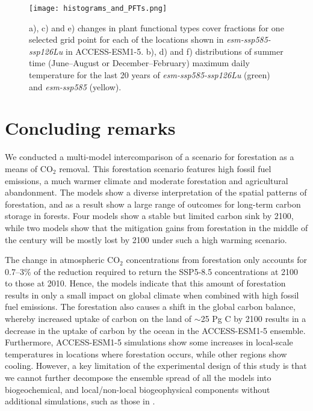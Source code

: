 \documentclass[draft]{agujournal2019}
\begin{document}
\begin{figure}
    \texttt{[image: histograms\_and\_PFTs.png]}
    \caption{a), c) and e) changes in plant functional types cover fractions for one selected grid point for each of the locations shown in \textit{esm-ssp585-ssp126Lu} in ACCESS-ESM1-5. b), d) and f) distributions of summer time (June--August or December--February) maximum daily temperature for the last 20 years of \textit{esm-ssp585-ssp126Lu} (green) and \textit{esm-ssp585} (yellow).}
    \label{fig:tasmax_distribution}
\end{figure}

\section{Concluding remarks}

We conducted a multi-model intercomparison of a scenario for forestation as a means of CO$_2$ removal.
This forestation scenario features high fossil fuel emissions, a much warmer climate and moderate forestation and agricultural abandonment.
The models show a diverse interpretation of the spatial patterns of forestation, and as a result show a large range of outcomes for long-term carbon storage in forests.
Four models show a stable but limited carbon sink by 2100, while two models show that the mitigation gains from forestation in the middle of the century will be mostly lost by 2100 under such a high warming scenario.

The change in atmospheric CO$_2$ concentrations from forestation only accounts for 0.7--3\% of the reduction required to return the SSP5-8.5 concentrations at 2100 to those at 2010.
Hence, the models indicate that this amount of forestation results in only a small impact on global climate when combined with high fossil fuel emissions.
The forestation also causes a shift in the global carbon balance, whereby increased uptake of carbon on the land of $\sim$25 Pg C by 2100 results in a decrease in the uptake of carbon by the ocean in the ACCESS-ESM1-5 ensemble.
Furthermore, ACCESS-ESM1-5 simulations show some increases in local-scale temperatures in locations where forestation occurs, while other regions show cooling.
However, a key limitation of the experimental design of this study is that we cannot further decompose the ensemble spread of all the models into biogeochemical, and local/non-local biogeophysical components without additional simulations, such as those in .
\end{document}
